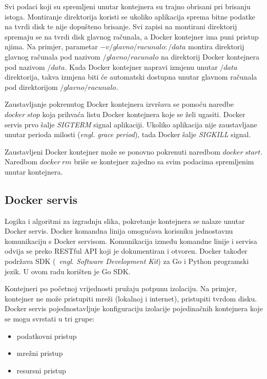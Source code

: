Svi podaci koji su spremljeni unutar kontejnera su trajno obrisani pri brisanju istoga. Montiranje
direktorija koristi se ukoliko aplikacija sprema bitne podatke na tvrdi disk te nije dopušteno
brisanje. Svi zapisi na montirani direktorij spremaju se na tvrdi disk glavnog računala, a Docker
kontejner ima puni pristup njima. Na primjer, parametar $-v /glavno/racunalo:/data$ montira
direktorij glavnog računala pod nazivom $/glavno/racunalo$ na direktorij Docker kontejnera pod
nazivom $/data$. Kada Docker kontejner napravi izmjenu unutar $/data$ direktorija, takva izmjena
biti će automatski dostupna unutar glavnom računala pod direktorijom $/glavno/racunalo$.

Zaustavljanje pokrenutog Docker kontejnera izvršava se pomoću naredbe $docker~stop$ koja prihvaća
listu Docker kontejnera koje se želi ugasiti. Docker servis prvo šalje \textit{SIGTERM} signal
aplikaciji. Ukoliko aplikacija nije zaustavljane unutar perioda milosti (\textit{engl. grace
period}), tada Docker šalje \textit{SIGKILL} signal.

Zaustavljeni Docker kontejner može se ponovno pokrenuti naredbom $docker~start$. Naredbom
$docker~rm$ briše se kontejner zajedno sa svim podacima spremljenim unutar kontejnera.

\subsection{Docker servis}
Logika i algoritmi za izgradnju slika, pokretanje kontejnera se nalaze unutar Docker servis. Docker
komandna linija omogućava korisniku jednostavnu komunikaciju s Docker servisom. Komunikacija između
komandne linije i servisa odvija se preko RESTful API koji je dokumentiran i otvoren. Docker također
podržava SDK (~\textit{engl. Software Development Kit}) za Go i Python programski jezik. U ovom radu
korišten je Go SDK.

Kontejneri po početnoj vrijednosti pružaju potpunu izolaciju. Na primjer, kontejner ne može
pristupiti mreži (lokalnoj i internet), pristupiti tvrdom disku. Docker servis pojednostavljuje
konfiguraciju izolacije pojedinačnih kontejnera koje se mogu svrstati u tri grupe:
\begin{itemize}
        \item podatkovni pristup
        \item mrežni pristup
        \item resursni pristup
\end{itemize}

